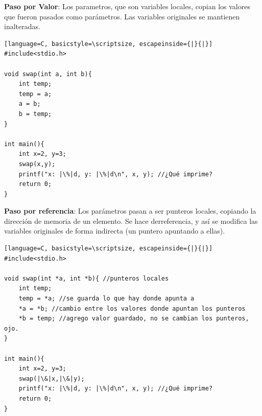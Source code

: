 \documentclass{article}
\begin{document}
\begin{itemize}
\begin{minipage}[h]{0.45\textwidth}
\item \textbf{Paso por Valor}: Los parametros, que son variables locales, copian los valores que fueron pasados como parámetros. Las variables originales se mantienen inalteradas.
\begin{lstlisting}[language=C, basicstyle=\scriptsize, escapeinside={|}{|}]
#include<stdio.h>

void swap(int a, int b){
	int temp;
	temp = a;
	a = b;
	b = temp;
}

int main(){
	int x=2, y=3;
	swap(x,y);
	printf("x: |\%|d, y: |\%|d\n", x, y); //¿Qué imprime?
	return 0;
}
\end{lstlisting}
\end{minipage}
\hspace{0.5cm}
\begin{minipage}[h]{0.45\textwidth}
\item \textbf{Paso por referencia}: Los parámetros pasan a ser punteros locales, copiando la dirección de memoria de un elemento. Se hace derreferencia, y así se modifica las variables originales de forma indirecta (un puntero apuntando a ellas).
\begin{lstlisting}[language=C, basicstyle=\scriptsize, escapeinside={|}{|}]
#include<stdio.h>

void swap(int *a, int *b){ //punteros locales
	int temp;
	temp = *a; //se guarda lo que hay donde apunta a
	*a = *b; //cambio entre los valores donde apuntan los punteros
	*b = temp; //agrego valor guardado, no se cambian los punteros, ojo.
}

int main(){
	int x=2, y=3;
	swap(|\&|x,|\&|y);
	printf("x: |\%|d, y: |\%|d\n", x, y); //¿Qué imprime?
	return 0;
}
\end{lstlisting}
\end{minipage}


\end{itemize}
\end{document}
